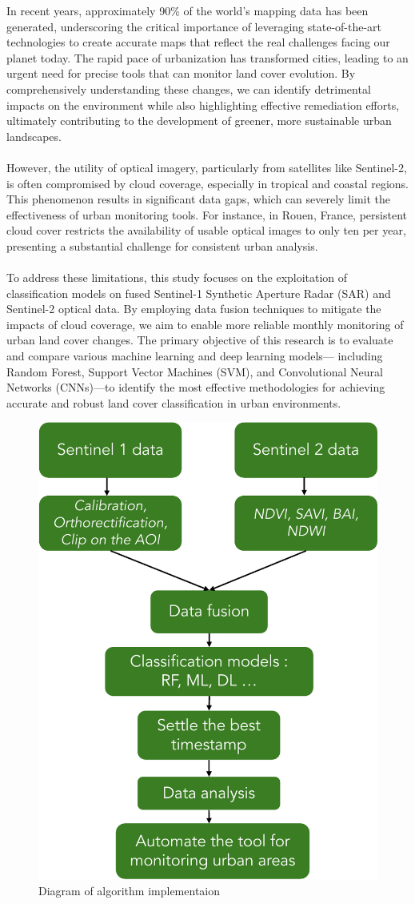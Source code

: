 \documentclass[usenatbib]{tjaa}
\begin{document}
\noindent
In recent years, approximately 90\% of the world's mapping data has been generated,
underscoring the critical importance of leveraging state-of-the-art technologies to create
accurate maps that reflect the real challenges facing our planet today. The rapid pace of
urbanization has transformed cities, leading to an urgent need for precise tools that can
monitor land cover evolution. By comprehensively understanding these changes, we can
identify detrimental impacts on the environment while also highlighting effective remediation
efforts, ultimately contributing to the development of greener, more sustainable urban
landscapes.
\\
\\
However, the utility of optical imagery, particularly from satellites like Sentinel-2, is often
compromised by cloud coverage, especially in tropical and coastal regions. This phenomenon
results in significant data gaps, which can severely limit the effectiveness of urban monitoring
tools. For instance, in Rouen, France, persistent cloud cover restricts the availability of usable
optical images to only ten per year, presenting a substantial challenge for consistent urban
analysis.
\\
\\
To address these limitations, this study focuses on the exploitation of classification models on
fused Sentinel-1 Synthetic Aperture Radar (SAR) and Sentinel-2 optical data. By employing
data fusion techniques to mitigate the impacts of cloud coverage, we aim to enable more
reliable monthly monitoring of urban land cover changes. The primary objective of this
research is to evaluate and compare various machine learning and deep learning models—
including Random Forest, Support Vector Machines (SVM), and Convolutional Neural
Networks (CNNs)—to identify the most effective methodologies for achieving accurate and
robust land cover classification in urban environments.
\begin{figure}
  \centering
  \includegraphics[width=.6\linewidth]{./figures/diagramme_sec1.pdf}
  \caption{Diagram of algorithm implementaion}
  \label{diagram-s1}
\end{figure}
\end{document}
